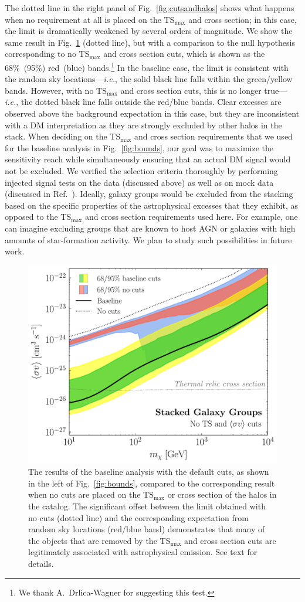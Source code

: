 The dotted line in the right panel of Fig.~\ref{fig:cutsandhalos} shows  what happens when no requirement at all is placed on the TS$_\text{max}$ and cross section; in this case, the limit is dramatically weakened by several orders of magnitude.   We show the same result in Fig.~\ref{fig:systematics_nots_cuts} (dotted line), but with a comparison to the null hypothesis corresponding to no TS$_\text{max}$ and cross section cuts, which is shown as the 68\%~(95\%) red~(blue) bands.\footnote{We thank A.~Drlica-Wagner for suggesting this test.}    In the baseline case, the limit is consistent with the random sky locations---\emph{i.e.}, the solid black line falls within the green/yellow bands.  However, with no TS$_\text{max}$ and cross section cuts, this is no longer true---\emph{i.e.}, the dotted black line falls outside the red/blue bands.  Clear excesses are observed above the background expectation in this case, but they are inconsistent with a DM interpretation as they are strongly excluded by other halos in the stack.  When deciding on the TS$_\text{max}$ and cross section requirements that we used for the baseline analysis in Fig.~\ref{fig:bounds}, our goal was to maximize the sensitivity reach while simultaneously ensuring that an actual DM signal would not be excluded.  We verified the selection criteria thoroughly by performing injected signal tests on the data (discussed above) as well as on mock data (discussed in Ref.~\cite{companion}).  Ideally, galaxy groups would be excluded from the stacking based on the specific properties of the astrophysical excesses that they exhibit, as opposed to the TS$_\text{max}$ and cross section requirements used here.  For example, one can imagine excluding groups that are known to host  AGN or galaxies with high amounts of star-formation activity.  We plan to study such possibilities in future work.        \vspace{0.1in}

\begin{figure}[tb]
  \centering
  \includegraphics[width=.5\textwidth]{ch-clusters/plots/systematics_nots_cuts.pdf}
  \caption{The results of the baseline analysis with the default cuts, as shown in the left of Fig.~\ref{fig:bounds}, compared to the corresponding result when no cuts are placed on the TS$_\text{max}$ or cross section of the halos in the catalog.  The significant offset between the limit obtained with no cuts (dotted line) and the corresponding expectation from random sky locations (red/blue band)  demonstrates that many of the objects that are removed by the TS$_\text{max}$ and cross section cuts are  legitimately associated with astrophysical emission. See text for details.}
  \label{fig:systematics_nots_cuts}
\end{figure}

